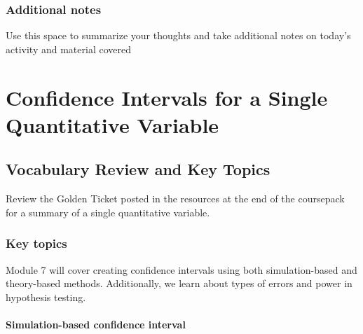 \documentclass[
]{report}
\begin{document}
\subsection{Additional notes}\label{additional-notes-12}

Use this space to summarize your thoughts and take additional notes on today's activity and material covered

\newpage

\chapter{Confidence Intervals for a Single Quantitative Variable}\label{confidence-intervals-for-a-single-quantitative-variable}

\section{Vocabulary Review and Key Topics}\label{vocabulary-review-and-key-topics-5}

Review the Golden Ticket posted in the resources at the end of the coursepack for a summary of a single quantitative variable.

\subsection{Key topics}\label{key-topics-6}

Module 7 will cover creating confidence intervals using both simulation-based and theory-based methods. Additionally, we learn about types of errors and power in hypothesis testing.

\subsubsection*{Simulation-based confidence interval}\label{simulation-based-confidence-interval}
\end{document}
